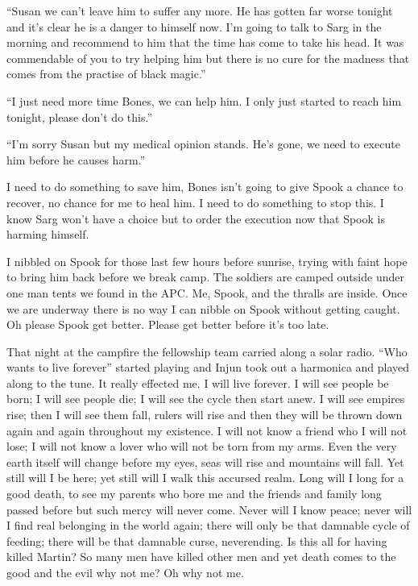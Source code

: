 ``Susan we can't leave him to suffer any more. He has gotten far worse tonight and it's clear he is a danger to himself now. I'm going to talk to Sarg in the morning and recommend to him that the time has come to take his head. It was commendable of you to try helping him but there is no cure for the madness that comes from the practise of black magic.''

``I just need more time Bones, we can help him. I only just started to reach him tonight, please don't do this.''

``I'm sorry Susan but my medical opinion stands. He's gone, we need to execute him before he causes harm.''

I need to do something to save him, Bones isn't going to give Spook a chance to recover, no chance for me to heal him. I need to do something to stop this. I know Sarg won't have a choice but to order the execution now that Spook is harming himself.

I nibbled on Spook for those last few hours before sunrise, trying with faint hope to bring him back before we break camp. The soldiers are camped outside under one man tents we found in the APC. Me, Spook, and the thralls are inside. Once we are underway there is no way I can nibble on Spook without getting caught. Oh please Spook get better. Please get better before it's too late.

\parasep


That night at the campfire the fellowship team carried along a solar radio. ``Who wants to live forever'' started playing and Injun took out a harmonica and played along to the tune. It really effected me. I will live forever. I will see people be born; I will see people die; I will see the cycle then start anew. I will see empires rise; then I will see them fall, rulers will rise and then they will be thrown down again and again throughout my existence. I will not know a friend who I will not lose; I will not know a lover who will not be torn from my arms. Even the very earth itself will change before my eyes, seas will rise and mountains will fall. Yet still will I be here; yet still will I walk this accursed realm. Long will I long for a good death, to see my parents who bore me and the friends and family long passed before but such mercy will never come. Never will I know peace; never will I find real belonging in the world again; there will only be that damnable cycle of feeding; there will be that damnable curse, neverending. Is this all for having killed Martin? So many men have killed other men and yet death comes to the good and the evil why not me? Oh why not me.

